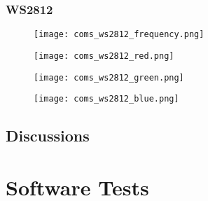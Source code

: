 \subsubsection{WS2812}
\begin{figure}[h!]
	\centering
	\texttt{[image: coms\_ws2812\_frequency.png]}
	\caption{}
	\label{coms_ws2812_frequency}
\end{figure}
\begin{figure}[h!]
	\centering
	\begin{minipage}[b]{\textwidth}
		\centering
		\texttt{[image: coms\_ws2812\_red.png]}
		\label{fig:coms_ws2812_red}
	\end{minipage}
	\begin{minipage}[b]{\textwidth}
		\centering
		\texttt{[image: coms\_ws2812\_green.png]}
		\label{fig:coms_ws2812_green}
	\end{minipage}
	\begin{minipage}[b]{\textwidth}
		\centering
		\texttt{[image: coms\_ws2812\_blue.png]}
		\label{fig:coms_ws2812_blue}
	\end{minipage}	
	\caption{}
	\label{ws2812}
\end{figure}
\subsection{Discussions}


\section{Software Tests}
